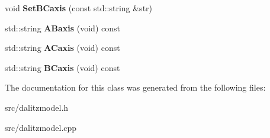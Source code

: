 \begin{DoxyCompactItemize}
\item 
\hypertarget{class_dalitz_model_a041193fbc879221012745c37f1d12f2b}{}void {\bfseries Set\+B\+Caxis} (const std\+::string \&str)\label{class_dalitz_model_a041193fbc879221012745c37f1d12f2b}

\item 
\hypertarget{class_dalitz_model_af44ef5d4a25814bc0a7242d3cf162359}{}std\+::string {\bfseries A\+Baxis} (void) const \label{class_dalitz_model_af44ef5d4a25814bc0a7242d3cf162359}

\item 
\hypertarget{class_dalitz_model_acce9a30d2009687a4f4d8c1a062dca73}{}std\+::string {\bfseries A\+Caxis} (void) const \label{class_dalitz_model_acce9a30d2009687a4f4d8c1a062dca73}

\item 
\hypertarget{class_dalitz_model_a794b8fd6c1008f75ab3f977fcb090244}{}std\+::string {\bfseries B\+Caxis} (void) const \label{class_dalitz_model_a794b8fd6c1008f75ab3f977fcb090244}

\end{DoxyCompactItemize}


The documentation for this class was generated from the following files\+:\begin{DoxyCompactItemize}
\item 
src/dalitzmodel.\+h\item 
src/dalitzmodel.\+cpp\end{DoxyCompactItemize}
